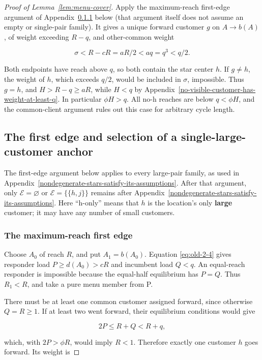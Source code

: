 \documentclass[11pt]{amsart}
\numberwithin{equation}{section}
\theoremstyle{definition}
\begin{document}
\begin{proof}[Proof of Lemma~\ref{lem:menu-cover}]
Apply the maximum-reach first-edge argument of Appendix~\ref{the-maximum-reach-first-edge} below (that argument itself does not assume an empty or single-pair family). It gives a unique forward customer \(g\) on \(A\to b(A)\), of weight exceeding \(R-q\), and other-common weight

\[
\sigma<R-cR=aR/2<aq=q^3<q/2.
\]

Both endpoints have reach above \(q\), so both contain the star center \(h\). If \(g\ne h\), the weight of \(h\), which exceeds \(q/2\), would be included in \(\sigma\), impossible. Thus \(g=h\), and \(H>R-q\ge aR\), while \(H<q\) by Appendix~\ref{no-visible-customer-has-weight-at-least-q}. In particular \(\phi H>q\). All no-h reaches are below \(q<\phi H\), and the common-client argument rules out this case for arbitrary cycle length.


\subsection{The first edge and selection of a single-large-customer anchor}\label{the-first-edge-and-selection-of-a-single-large-customer-anchor}

The first-edge argument below applies to every large-pair family, as used in Appendix~\ref{nondegenerate-stars-satisfy-its-assumptions}. After that argument, only \(\mathcal E=\varnothing\) or \(\mathcal E=\{\{h,j\}\}\) remains after Appendix~\ref{nondegenerate-stars-satisfy-its-assumptions}. Here ``h-only'' means that \(h\) is the location's only \textbf{large} customer; it may have any number of small customers.


\subsubsection{The maximum-reach first edge}\label{the-maximum-reach-first-edge}

Choose \(A_0\) of reach \(R\), and put \(A_1=b(A_0)\). Equation \eqref{eq:old-2-4} gives responder load \(P\ge d(A_0)>cR\) and incumbent load \(Q<q\). An equal-reach responder is impossible because the equal-half equilibrium has \(P=Q\). Thus \(R_1<R\), and take a pure menu member from P.

There must be at least one common customer assigned forward, since otherwise \(Q=R\ge1\). If at least two went forward, their equilibrium conditions would give

\[
2P\le R+Q<R+q,
\]

which, with \(2P>\phi R\), would imply \(R<1\). Therefore exactly one customer \(h\) goes forward. Its weight is


\end{proof}
\end{document}
